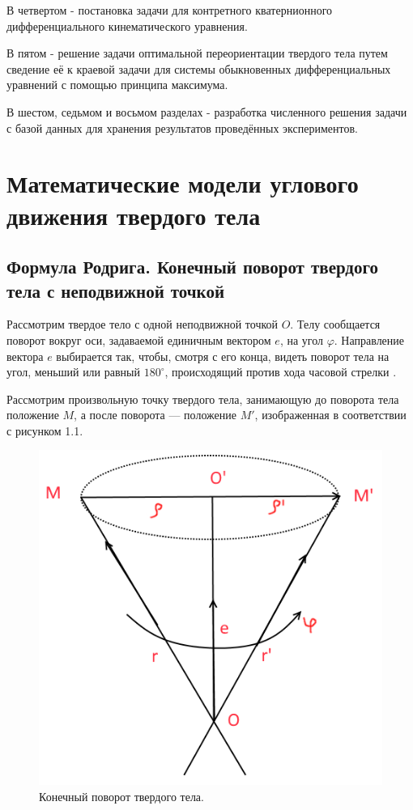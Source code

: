 \documentclass[14pt]{extreport}
\renewcommand{\phi}{\varphi} %
\begin{document}
В четвертом - постановка задачи для контретного кватернионного дифференциального кинематического уравнения.

В пятом - решение задачи оптимальной переориентации твердого тела путем сведение её к краевой задачи для системы обыкновенных дифференциальных уравнений с помощью принципа максимума.

В шестом, седьмом и восьмом разделах - разработка численного решения задачи с базой данных для хранения результатов проведённых экспериментов.

\chapter{Математические модели углового движения твердого тела}
\section{Формула Родрига. Конечный поворот твердого тела с неподвижной точкой}

Рассмотрим твердое тело с одной неподвижной точкой $O$. Телу сообща­ется поворот вокруг оси, задаваемой единичным вектором $e$, на угол $\phi$. Направление вектора $e$ выбирается так, чтобы, смотря с его конца, видеть поворот тела на угол, меньший или равный $180^{\circ}$, происходящий против хода часовой стрелки \cite{chelnokov}.

Рассмотрим произвольную точку твердого тела, занимающую до по­ворота тела положение $M$, а после поворота — положение $M'$, изображенная в соответствии с рисунком 1.1.

\begin{figure}[H]
\center\includegraphics[scale=0.5]{fig/img11.png}
\caption{Конечный поворот твердого тела.}
\end{figure}
\end{document}
